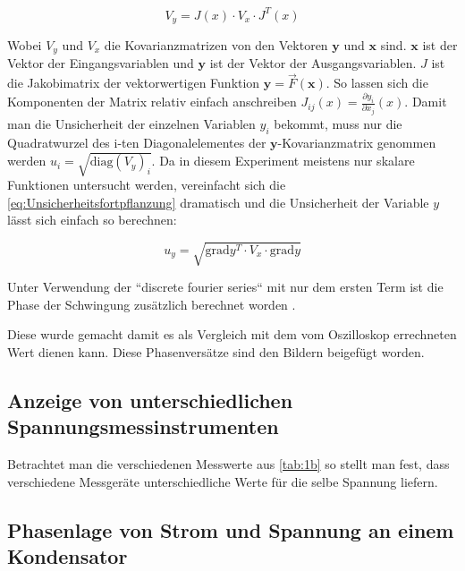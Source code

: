 \documentclass[11pt,ngerman]{scrartcl}
\begin{document}
\begin{equation}
	\label{eq:Unsicherheitsfortpflanzung}
	V_y = J(x) \cdot V_x \cdot J^{T}(x)
\end{equation}

\noindent Wobei $V_y$ und $V_x$ die Kovarianzmatrizen von den Vektoren $\bm{y}$ und $\bm{x}$ sind.
$\bm{x}$ ist der Vektor der Eingangsvariablen und $\bm{y}$ ist der Vektor der Ausgangsvariablen.
$J$ ist die Jakobimatrix der vektorwertigen Funktion $\bm{y} = \vec{F}(\bm{x})$.
So lassen sich die Komponenten der Matrix relativ einfach anschreiben $J_{ij}(x) = \frac{\partial{y_i}}{\partial{x_j}}(x)$.
Damit man die Unsicherheit der einzelnen Variablen $y_i$ bekommt, muss nur die Quadratwurzel des i-ten Diagonalelementes der
$\bm{y}$-Kovarianzmatrix genommen werden $u_i= \sqrt{\mathrm{diag}(V_y)_i}$.
Da in diesem Experiment meistens nur skalare Funktionen untersucht werden, vereinfacht
sich die \autoref{eq:Unsicherheitsfortpflanzung} dramatisch und die Unsicherheit
der Variable $y$ lässt sich einfach so berechnen:

\begin{equation}
	\label{eq:graduncentainty}
	u_y = \sqrt{\mathrm{grad} y^T \cdot V_x \cdot \mathrm{grad} y}
\end{equation}

\vspace{2mm}

Unter Verwendung der ``discrete fourier series`` mit nur dem ersten Term ist
die Phase der Schwingung zusätzlich berechnet worden \cite{welligkeitfourier}.

Diese wurde gemacht damit es als Vergleich mit dem vom Oszilloskop errechneten
Wert dienen kann. Diese Phasenversätze sind den Bildern beigefügt worden.


\subsection{Anzeige von unterschiedlichen Spannungsmessinstrumenten}

Betrachtet man die verschiedenen Messwerte aus \autoref{tab:1b} so stellt man
fest, dass verschiedene Messgeräte unterschiedliche Werte für die selbe
Spannung liefern.



\subsection{Phasenlage von Strom und Spannung an einem Kondensator}
\end{document}
